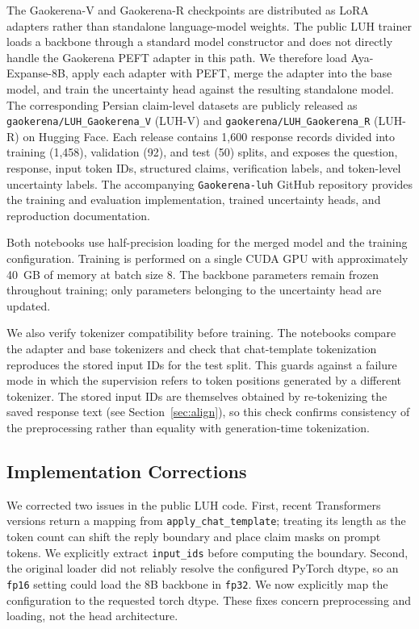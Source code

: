 \documentclass[conference,a4paper]{IEEEtran}
\begin{document}
The Gaokerena-V and Gaokerena-R checkpoints are distributed as LoRA adapters rather than standalone language-model weights. The public LUH trainer loads a backbone through a standard model constructor and does not directly handle the Gaokerena PEFT adapter in this path. We therefore load Aya-Expanse-8B, apply each adapter with PEFT, merge the adapter into the base model, and train the uncertainty head against the resulting standalone model. The corresponding Persian claim-level datasets are publicly released as \texttt{gaokerena/LUH\_Gaokerena\_V} (LUH-V) and \texttt{gaokerena/LUH\_Gaokerena\_R} (LUH-R) on Hugging Face. Each release contains 1,600 response records divided into training (1,458), validation (92), and test (50) splits, and exposes the question, response, input token IDs, structured claims, verification labels, and token-level uncertainty labels. The accompanying \texttt{Gaokerena-luh} GitHub repository provides the training and evaluation implementation, trained uncertainty heads, and reproduction documentation.

Both notebooks use half-precision loading for the merged model and the training configuration. Training is performed on a single CUDA GPU with approximately 40~GB of memory at batch size 8. The backbone parameters remain frozen throughout training; only parameters belonging to the uncertainty head are updated.

We also verify tokenizer compatibility before training. The notebooks compare the adapter and base tokenizers and check that chat-template tokenization reproduces the stored input IDs for the test split. This guards against a failure mode in which the supervision refers to token positions generated by a different tokenizer. The stored input IDs are themselves obtained by re-tokenizing the saved response text (see Section~\ref{sec:align}), so this check confirms consistency of the preprocessing rather than equality with generation-time tokenization.

\subsection{Implementation Corrections}

We corrected two issues in the public LUH code. First, recent Transformers versions return a mapping from \texttt{apply\_chat\_template}; treating its length as the token count can shift the reply boundary and place claim masks on prompt tokens. We explicitly extract \texttt{input\_ids} before computing the boundary. Second, the original loader did not reliably resolve the configured PyTorch dtype, so an \texttt{fp16} setting could load the 8B backbone in \texttt{fp32}. We now explicitly map the configuration to the requested torch dtype. These fixes concern preprocessing and loading, not the head architecture.
\end{document}
